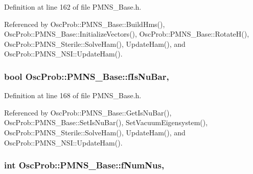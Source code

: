 Definition at line 162 of file P\+M\+N\+S\+\_\+\+Base.\+h.



Referenced by Osc\+Prob\+::\+P\+M\+N\+S\+\_\+\+Base\+::\+Build\+Hms(), Osc\+Prob\+::\+P\+M\+N\+S\+\_\+\+Base\+::\+Initialize\+Vectors(), Osc\+Prob\+::\+P\+M\+N\+S\+\_\+\+Base\+::\+Rotate\+H(), Osc\+Prob\+::\+P\+M\+N\+S\+\_\+\+Sterile\+::\+Solve\+Ham(), Update\+Ham(), and Osc\+Prob\+::\+P\+M\+N\+S\+\_\+\+N\+S\+I\+::\+Update\+Ham().

\subsubsection[{\texorpdfstring{f\+Is\+Nu\+Bar}{fIsNuBar}}]{\setlength{\rightskip}{0pt plus 5cm}bool Osc\+Prob\+::\+P\+M\+N\+S\+\_\+\+Base\+::f\+Is\+Nu\+Bar\hspace{0.3cm}{\ttfamily [protected]}, {\ttfamily [inherited]}}\hypertarget{classOscProb_1_1PMNS__Base_a0ebaeaefab36a3ff381c6293faedfdd6}{}\label{classOscProb_1_1PMNS__Base_a0ebaeaefab36a3ff381c6293faedfdd6}


Definition at line 168 of file P\+M\+N\+S\+\_\+\+Base.\+h.



Referenced by Osc\+Prob\+::\+P\+M\+N\+S\+\_\+\+Base\+::\+Get\+Is\+Nu\+Bar(), Osc\+Prob\+::\+P\+M\+N\+S\+\_\+\+Base\+::\+Set\+Is\+Nu\+Bar(), Set\+Vacuum\+Eigensystem(), Osc\+Prob\+::\+P\+M\+N\+S\+\_\+\+Sterile\+::\+Solve\+Ham(), Update\+Ham(), and Osc\+Prob\+::\+P\+M\+N\+S\+\_\+\+N\+S\+I\+::\+Update\+Ham().

\subsubsection[{\texorpdfstring{f\+Num\+Nus}{fNumNus}}]{\setlength{\rightskip}{0pt plus 5cm}int Osc\+Prob\+::\+P\+M\+N\+S\+\_\+\+Base\+::f\+Num\+Nus\hspace{0.3cm}{\ttfamily [protected]}, {\ttfamily [inherited]}}\hypertarget{classOscProb_1_1PMNS__Base_a24bb74bed63569dfe88b18fa6a08060e}{}\label{classOscProb_1_1PMNS__Base_a24bb74bed63569dfe88b18fa6a08060e}


